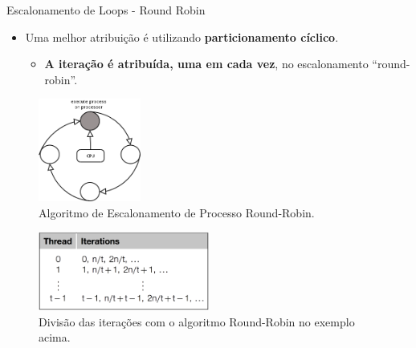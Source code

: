 	\begin{frame}{Escalonamento de Loops - Round Robin}
		\begin{itemize}
			\item Uma melhor atribuição é utilizando \textbf{particionamento cíclico}.
			\begin{itemize}
				\item \textbf{A iteração é atribuída, uma em cada vez}, no escalonamento ``round-robin''.
			\end{itemize}
		\end{itemize}

		\begin{multicols}{2}
			\begin{figure}[p]
				\centering
				\includegraphics[width=0.3\textwidth]{img/pacheco/rr.png}
				\caption{Algoritmo de Escalonamento de Processo Round-Robin.}
			\end{figure}
		\columnbreak
					\pause
			\begin{figure}[p]
				\centering
				\includegraphics[width=0.5\textwidth]{img/pacheco/rr-threads.png}
				\caption{Divisão das iterações com o algoritmo Round-Robin no exemplo acima.}
			\end{figure}
		\end{multicols}
	\end{frame}


